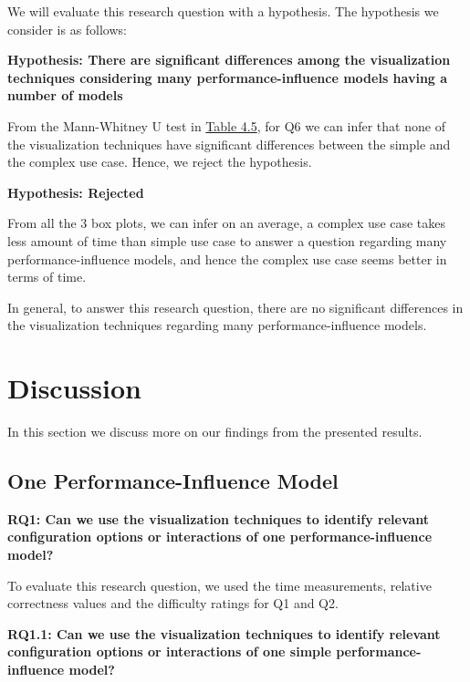 \begin{description}[leftmargin=0pt]
We will evaluate this research question with a hypothesis. The hypothesis we consider is as follows:

\begin{mdframed}
\textbf {Hypothesis: There are significant differences among the visualization techniques considering many performance-influence models having a number of models}
\end{mdframed}

From the Mann-Whitney U test in \hyperref[table:q5q6MannWhitney]{Table 4.5}, for Q6 we can infer that none of the visualization techniques have significant differences between the simple and the complex use case. Hence, we reject the hypothesis.

\begin{mdframed}
\textbf {Hypothesis: Rejected}
\end{mdframed}
\end{description}

From all the 3 box plots, we can infer on an average, a complex use case takes less amount of time than simple use case to answer a question regarding many performance-influence models, and hence the complex use case seems better in terms of time.

In general, to answer this research question, there are no significant differences in the visualization techniques regarding many performance-influence models.


\section{Discussion}
\label{sec:4.5}
In this section we discuss more on our findings from the presented results. 

\subsection*{One Performance-Influence Model}
\vskip 0.2in
\begin{mdframed}
\textbf{RQ1: Can we use the visualization techniques to identify relevant configuration options or interactions  of one performance-influence model?}
\end{mdframed}

To evaluate this research question, we used the time measurements, relative correctness values and the difficulty ratings for Q1 and Q2.

\vskip 0.2in
\begin{mdframed}
\textbf{RQ1.1: Can we use the visualization techniques to identify relevant configuration options or interactions  of one simple performance-influence model?}
\end{mdframed}

